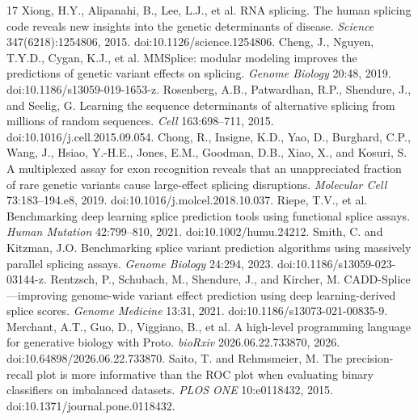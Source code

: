 \documentclass[11pt]{article}
\begin{document}
\begin{thebibliography}{17}
 Xiong, H.Y., Alipanahi, B., Lee, L.J., et al. RNA splicing. The human splicing code reveals new insights into the genetic determinants of disease. \emph{Science} 347(6218):1254806, 2015. doi:10.1126/science.1254806.
 Cheng, J., Nguyen, T.Y.D., Cygan, K.J., et al. MMSplice: modular modeling improves the predictions of genetic variant effects on splicing. \emph{Genome Biology} 20:48, 2019. doi:10.1186/s13059-019-1653-z.
 Rosenberg, A.B., Patwardhan, R.P., Shendure, J., and Seelig, G. Learning the sequence determinants of alternative splicing from millions of random sequences. \emph{Cell} 163:698--711, 2015. doi:10.1016/j.cell.2015.09.054.
 Chong, R., Insigne, K.D., Yao, D., Burghard, C.P., Wang, J., Hsiao, Y.-H.E., Jones, E.M., Goodman, D.B., Xiao, X., and Kosuri, S. A multiplexed assay for exon recognition reveals that an unappreciated fraction of rare genetic variants cause large-effect splicing disruptions. \emph{Molecular Cell} 73:183--194.e8, 2019. doi:10.1016/j.molcel.2018.10.037.
 Riepe, T.V., et al. Benchmarking deep learning splice prediction tools using functional splice assays. \emph{Human Mutation} 42:799--810, 2021. doi:10.1002/humu.24212.
 Smith, C. and Kitzman, J.O. Benchmarking splice variant prediction algorithms using massively parallel splicing assays. \emph{Genome Biology} 24:294, 2023. doi:10.1186/s13059-023-03144-z.
 Rentzsch, P., Schubach, M., Shendure, J., and Kircher, M. CADD-Splice---improving genome-wide variant effect prediction using deep learning-derived splice scores. \emph{Genome Medicine} 13:31, 2021. doi:10.1186/s13073-021-00835-9.
 Merchant, A.T., Guo, D., Viggiano, B., et al. A high-level programming language for generative biology with Proto. \emph{bioRxiv} 2026.06.22.733870, 2026. doi:10.64898/2026.06.22.733870.
 Saito, T. and Rehmsmeier, M. The precision-recall plot is more informative than the ROC plot when evaluating binary classifiers on imbalanced datasets. \emph{PLOS ONE} 10:e0118432, 2015. doi:10.1371/journal.pone.0118432.
\end{thebibliography}
\end{document}
